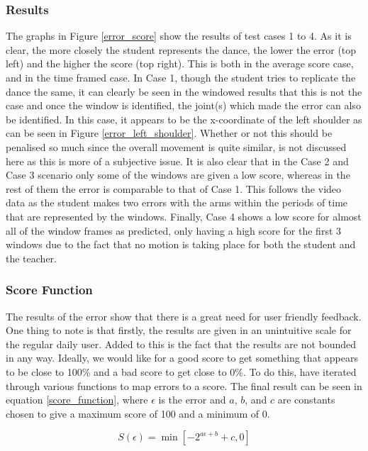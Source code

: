 \documentclass[10pt,a4paper]{article}
\begin{document}
\subsubsection{Results}
\noindent
The graphs in Figure \ref{error_score} show the results of test cases 1 to 4. As it is clear, the more closely the student represents the dance, the lower the error (top left) and the higher the score (top right). This is both in the average score case, and in the time framed case. In Case 1, though the student tries to replicate the dance the same, it can clearly be seen in the windowed results that this is not the case and once the window is identified, the joint(s) which made the error can also be identified. In this case, it appears to be the x-coordinate of the left shoulder as can be seen in Figure \ref{error_left_shoulder}. Whether or not this should be penalised so much since the overall movement is quite similar, is not discussed here as this is more of a subjective issue. It is also clear that in the Case 2 and Case 3 scenario only some of the windows are given a low score, whereas in the rest of them the error is comparable to that of Case 1. This follows the video data as the student makes two errors with the arms within the periods of time that are represented by the windows. Finally, Case 4 shows a low score for almost all of the window frames as predicted, only having a high score for the first 3 windows due to the fact that no motion is taking place for both the student and the teacher. 

\subsubsection{Score Function}
\noindent
The results of the error show that there is a great need for user friendly feedback. One thing to note is that firstly, the results are given in an unintuitive scale for the regular daily user. Added to this is the fact that the results are not bounded in any way. Ideally, we would like for a good score to get something that appears to be close to 100\% and a bad score to get close to 0\%. To do this, have iterated through various functions to map errors to a score. The final result can be seen in equation \eqref{score_function}, where $\epsilon$ is the error and $a$, $b$, and $c$ are constants chosen to give a maximum score of 100 and a minimum of 0.

 
\begin{equation}
S(\epsilon) = \min\left[ -2^{a\epsilon + b}+c, 0 \right]
\end{equation}
\end{document}
